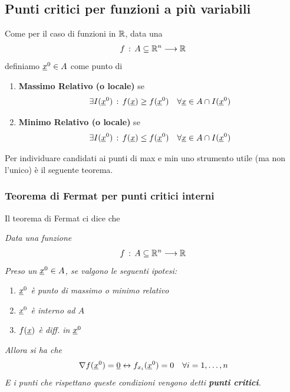 \newpage

\subsection{Punti critici per funzioni a più variabili}

Come per il caso di funzioni in $\mathbb{R}$, data una
\begin{align}
	f \, : \, A\subseteq \mathbb{R}^{n} \longrightarrow \mathbb{R}^{}
\end{align} 
definiamo $\underline{x}^0\in A$ come punto di
\begin{enumerate}
	\item \textbf{Massimo Relativo (o locale)} se
	\begin{align}
		\exists I(\underline{x}^0) \, : \, f(\underline{x})\geq f(\underline{x}^0) \quad \forall \underline{x} \in A\cap I(\underline{x}^0)
	\end{align}
	\item \textbf{Minimo Relativo (o locale)} se
	\begin{align}
		\exists I(\underline{x}^0) \, : \, f(\underline{x}) \leq f(\underline{x}^0) \quad \forall \underline{x} \in A\cap I(\underline{x}^0)
	\end{align}
\end{enumerate}

Per individuare candidati ai punti di max e min uno strumento utile (ma non l'unico) è il seguente teorema.

\subsubsection{Teorema di Fermat per punti critici interni}

Il teorema di Fermat ci dice che

\bigskip

\textit{Data una funzione}
\begin{align}
	f \, : \, A\subseteq \mathbb{R}^{n} \longrightarrow \mathbb{R}^{}
\end{align}
\textit{Preso un $\underline{x}^0\in A$, se valgono le seguenti ipotesi:}
\begin{enumerate}
	\item \textit{$\underline{x}^0$ è punto di massimo o minimo relativo}
	\item \textit{$\underline{x}^0$ è interno ad $A$}
	\item \textit{$f(\underline{x})$ è diff. in $\underline{x}^0$}
\end{enumerate}
\textit{Allora si ha che}
\begin{align}
	\nabla f(\underline{x}^0)= \underline{0} \leftrightarrow f_{x_i}(\underline{x}^0)=0 \quad \forall i=1,\dots,n 
\end{align}
\textit{E i punti che rispettano queste condizioni vengono detti \textbf{punti critici}.}

